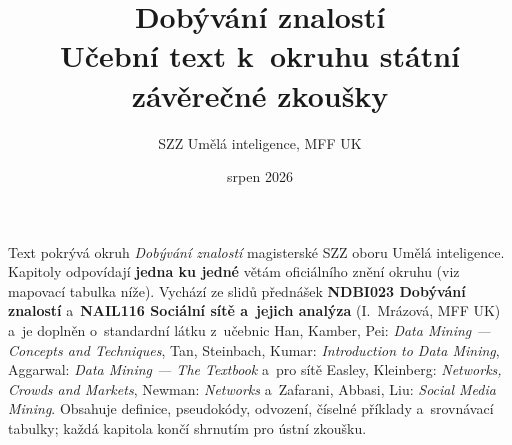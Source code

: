 \documentclass[11pt,a4paper]{article}
\title{\textbf{Dobývání znalostí}\\[2mm]
\large Učební text k~okruhu státní závěrečné zkoušky}
\author{SZZ Umělá inteligence, MFF UK}
\date{srpen 2026}
\theoremstyle{definition}
\begin{document}
\maketitle

\begin{center}
\begin{minipage}{0.92\textwidth}
\small
Text pokrývá okruh \emph{Dobývání znalostí} magisterské SZZ oboru Umělá inteligence.
Kapitoly odpovídají \textbf{jedna ku jedné} větám oficiálního znění okruhu (viz mapovací
tabulka níže). Vychází ze slidů přednášek \textbf{NDBI023 Dobývání znalostí}
a~\textbf{NAIL116 Sociální sítě a~jejich analýza} (I.~Mrázová, MFF UK) a~je doplněn
o~standardní látku z~učebnic Han, Kamber, Pei: \emph{Data Mining --- Concepts and
Techniques}, Tan, Steinbach, Kumar: \emph{Introduction to Data Mining}, Aggarwal:
\emph{Data Mining --- The Textbook} a~pro sítě Easley, Kleinberg: \emph{Networks, Crowds
and Markets}, Newman: \emph{Networks} a~Zafarani, Abbasi, Liu: \emph{Social Media Mining}.
Obsahuje definice, pseudokódy, odvození, číselné příklady a~srovnávací tabulky; každá
kapitola končí shrnutím pro ústní zkoušku.
\end{minipage}
\end{center}
\end{document}
